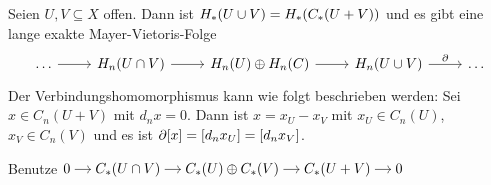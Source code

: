 \begin{erinnerungA}[{name=[{Konstruktion der Mayer-Vietoris-Folge in Homologie}]}]
	Seien $U,V \subseteq X$ offen. Dann ist $H_*(U \cup V) = H_* \enbrace*{C_*(U+V)}$ und es gibt eine lange exakte Mayer-Vietoris-Folge 
	\[
		\begin{tikzcd}
			\ldots  \rar & H_n(U \cap V) \rar & H_n(U) \oplus H_n(C) \rar & H_n(U \cup V) \rar["\partial"]& \ldots 
		\end{tikzcd}
	\]
	Der Verbindungshomomorphismus kann wie folgt beschrieben werden: Sei $x \in C_n(U + V)$ mit $d_n x =0$.
	Dann ist $x=x_U - x_V$ mit $x_U \in C_n(U)$, $x_V \in C_n(V)$ und es ist $\partial[x] = \benbrace*{d_n x_U} = \benbrace*{d_n x_V}$.
\end{erinnerungA}
\begin{beweis}
	Benutze 
	\(
		\begin{tikzcd}[sep=small,cramped]
			0 \rar & C_*(U \cap V) \rar & C_*(U) \oplus C_*(V) \rar & C_*(U+V) \rar & 0
		\end{tikzcd}
	\)
\end{beweis}

